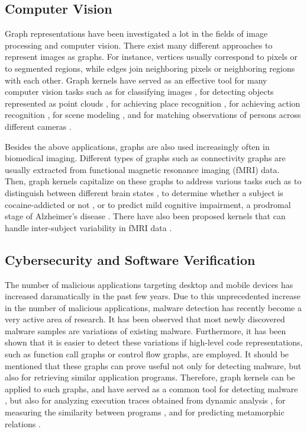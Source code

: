 \documentclass[twoside,11pt]{article}
\begin{document}
\subsection{Computer Vision}
Graph representations have been investigated a lot in the fields of image processing and computer vision.
There exist many different approaches to represent images as graphs.
For instance, vertices usually correspond to pixels or to segmented regions, while edges join neighboring pixels or neighboring regions with each other.
Graph kernels have served as an effective tool for many computer vision tasks such as for classifying images , for detecting objects represented as point clouds , for achieving place recognition , for achieving action recognition , for scene  modeling , and for matching observations of persons across different cameras .

Besides the above applications, graphs are also used increasingly often in biomedical imaging.
Different types of graphs such as connectivity graphs are usually extracted from functional magnetic resonance imaging (fMRI) data.
Then, graph kernels capitalize on these graphs to address various tasks such as to distinguish between different brain states , to determine whether a subject is cocaine-addicted or not , or to predict mild cognitive impairment, a prodromal stage of Alzheimer's disease .
There have also been proposed kernels that can handle inter-subject variability in fMRI data .

\subsection{Cybersecurity and Software Verification}
The number of malicious applications targeting desktop and mobile devices has increased daramatically in the past few years.
Due to this unprecedented increase in the number of malicious applications, malware detection has recently become a very active area of research.
It has been observed that most newly discovered malware samples are variations of existing malware. 
Furthermore, it has been shown that it is easier to detect these variations if high-level code representations, such as function call graphs or control flow graphs, are employed.
It should be mentioned that these graphs can prove useful not only for detecting malware, but also for retrieving similar application programs.
Therefore, graph kernels can be applied to such graphs, and have served as a common tool for detecting malware , but also for analyzing execution traces obtained from dynamic analysis , for measuring the similarity between programs , and for predicting metamorphic relations .
\end{document}
